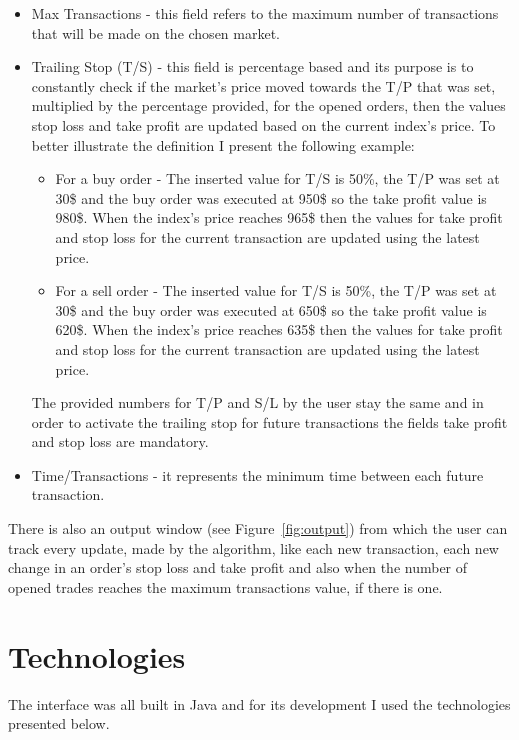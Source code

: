 \documentclass[12pt,a4paper]{report}
\begin{document}
\begin{itemize}
	\item Max Transactions - this field refers to the maximum number of transactions that will be made on the chosen market.
	
	\item Trailing Stop (T/S) - this field is percentage based and its purpose is to constantly check if the market's price moved towards the T/P that was set, multiplied by the percentage provided, for the opened orders, then the values stop loss and take profit are updated based on the current index's price. To better illustrate the definition I present the following example:
	\begin{itemize}
		\item For a buy order - The inserted value for T/S is 50\%, the T/P was set at 30\$ and the buy order was executed at 950\$ so the take profit value is 980\$. When the index's price reaches 965\$ then the values for take profit and stop loss for the current transaction are updated using the latest price. 
		\item For a sell order - The inserted value for T/S is 50\%, the T/P was set at 30\$ and the buy order was executed at 650\$ so the take profit value is 620\$. When the index's price reaches 635\$ then the values for take profit and stop loss for the current transaction are updated using the latest price.
	\end{itemize}
	The provided numbers for T/P and S/L by the user stay the same and in order to activate the trailing stop for future transactions the fields take profit and stop loss are mandatory.
	
	\item Time/Transactions - it represents the minimum time between each future transaction.
\end{itemize}
There is also an output window (see Figure~\ref{fig:output}) from which the user can track every update, made by the algorithm, like each new transaction, each new change in an order's stop loss and take profit and also when the number of opened trades reaches the maximum transactions value, if there is one.

\section{Technologies}
The interface was all built in Java and for its development I used the technologies presented below. 
\end{document}
